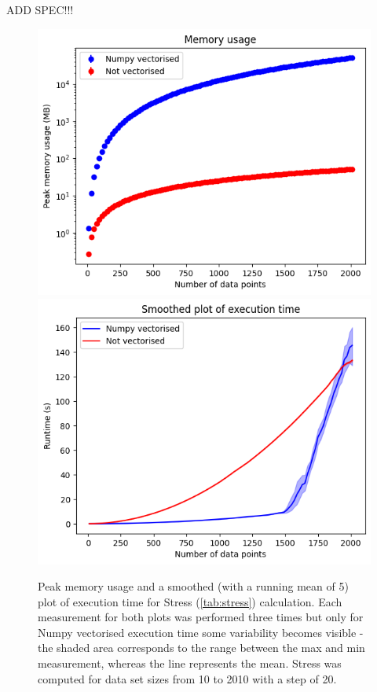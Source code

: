 \documentclass{l4proj}
\begin{document}
ADD SPEC!!!

\begin{figure}[h]
    \centering
    \includegraphics[width=0.4\linewidth]{images/stress_vectorised/memory.png}
    \includegraphics[width=0.4\linewidth]{images/stress_vectorised/time.png} 
 
    \caption{Peak memory usage and a smoothed (with a running mean of 5) plot of execution time for Stress (\ref{tab:stress}) calculation. Each measurement for both plots was performed three times but only for Numpy vectorised execution time some variability becomes visible - the shaded area corresponds to the range between the max and min measurement, whereas the line represents the mean. Stress was computed for data set sizes from 10 to 2010 with a step of 20.
    }

    \label{fig:stress_vectorised} 
\end{figure}
\end{document}
